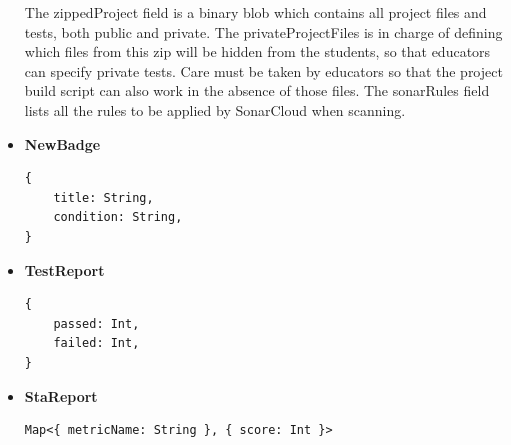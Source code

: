 \begin{itemize}
          The zippedProject field is a binary blob which contains all project files and tests, both public and private.
          The privateProjectFiles is in charge of defining which files from this zip will be hidden from the students,
          so that educators can specify private tests. Care must be taken by educators so that the project build script 
          can also work in the absence of those files. The sonarRules field lists all the rules to be applied by 
          SonarCloud when scanning.
    \item \textbf{NewBadge}
          \begin{lstlisting}
{
    title: String,
    condition: String,
} 
          \end{lstlisting}
    \item \textbf{TestReport}
          \begin{lstlisting}
{
    passed: Int,
    failed: Int,
} 
          \end{lstlisting}
    \item \textbf{StaReport}
          \begin{lstlisting}
Map<{ metricName: String }, { score: Int }> 
          \end{lstlisting}
\end{itemize}

